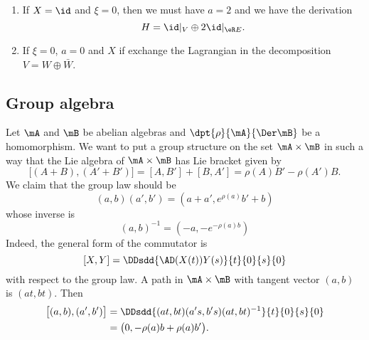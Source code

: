 \begin{enumerate}

    \item
        If $X=\id$ and $\xi=0$, then we must have $a=2$ and we have the derivation
        \begin{equation}
            H=\id|_V\oplus 2\id|_{\eR E}.
        \end{equation}
    \item
        If $\xi=0$, $a=0$ and $X$ if exchange the Lagrangian in the decomposition $V=W\oplus \bar W$.
\end{enumerate}

\subsection{Group algebra}

Let $\mA$ and $\mB$ be abelian algebras and $\dpt{\rho}{\mA}{\Der\mB}$ be a homomorphism. We want to put a group structure on the set $\mA\times\mB$ in such a way that the Lie algebra of $\mA\times\mB$ has Lie bracket given by
\begin{equation}
\big[ (A+B),(A'+B')  \big]=[A,B']+[B,A']=\rho(A)B'-\rho(A')B.
\end{equation}
We claim that the group law should be
\begin{equation}
(a,b)(a',b')=(a+a',e^{\rho(a)}b'+b)
\end{equation}
whose inverse is
\begin{equation}
(a,b)^{-1}=(-a,-e^{-\rho(a)b})
\end{equation}
Indeed, the general form of the commutator is
\[
  [X,Y]=\DDsdd{ \AD(X(t))Y(s) }{t}{0}{s}{0}
\]
with respect to the group law. A path in $\mA\times\mB$ with tangent vector $(a,b)$ is $(at,bt)$. Then
\begin{equation}
\begin{split}
\big[ (a,b),(a',b') \big]&=\DDsdd{ (at,bt)(a's,b's)(at,bt)^{-1} }{t}{0}{s}{0}\\
            &=\big(0,-\rho(a)b+\rho(a)b'\big).
\end{split}
\end{equation}
